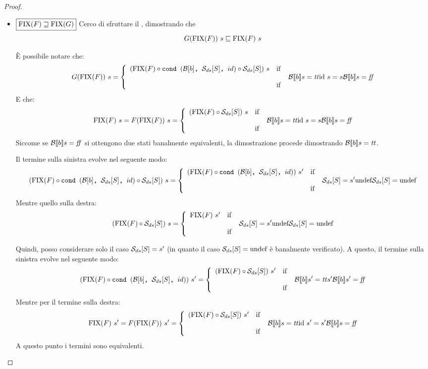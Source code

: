 {\begin{proof}
\begin{itemize}
  \item $\boxed{\textrm{\normalfont{FIX}}(F) \sqsupseteq \textrm{\normalfont{FIX}}(G)}$
  Cerco di sfruttare il \FPIL, dimostrando che
  $$
  G(\fixp{F})\ s \sqsubseteq \fixp{F}\ s
  $$

  È possibile notare che:
  $$
  G(\fixp{F})\ s =
    \caseFun{(\fixp{F} \circ
                 \cond{b}{\dsCtxt{S}}{id} \circ \dsCtxt{S})\ s}
            {\B{b} = \semtrue}
            {\idDS\ s = s}
            {\B{b} = \semfalse}
  $$
  E che:
  $$
  \fixp{F}\ s = F(\fixp{F})\ s =
    \caseFun{(\fixp{F} \circ \dsCtxt{S})\ s}
            {\B{b} = \semtrue}
            {\idDS\ s = s}
            {\B{b} = \semfalse}
  $$
  Siccome se $\mathcal{B} \llbracket b \rrbracket s = \mbox{\textit{ff}}$ si ottengono due stati banalmente equivalenti,
  la dimostrazione procede dimostrando $\mathcal{B} \llbracket b \rrbracket s = \mbox{\textit{tt}}$.

  Il termine sulla sinistra evolve nel seguente modo:
  $$
  (\fixp{F} \circ \cond{b}{\dsCtxt{S}}{id} \circ \dsCtxt{S})\ s =
    \caseFun{(\fixp{F} \circ
                 \cond{b}{\dsCtxt{S}}{id})\ s'}
            {\dsCtxt{S} = s'}
            {\undefDS}
            {\dsCtxt{S} = \undefDS}
  $$
  Mentre quello sulla destra:
  $$
  (\fixp{F} \circ \dsCtxt{S})\ s =
    \caseFun{\fixp{F}\ s'}
            {\dsCtxt{S} = s'}
            {\undefDS}
            {\dsCtxt{S} = \undefDS}
  $$

  Quindi, posso considerare solo il caso $\mathcal{S}_{ds}[S] = s'$ (in quanto il caso
  $\mathcal{S}_{ds}[S] = \textrm{\normalfont{undef}}$ è banalmente verificato). A questo, il termine sulla
  sinistra evolve nel seguente modo:
  $$
  (\fixp{F} \circ \cond{b}{\dsCtxt{S}}{id})\ s' =
    \caseFun{(\fixp{F} \circ \dsCtxt{S})\ s'}
            {\B{b}' = \semtrue}
            {s'}
            {\B{b}' = \semfalse}
  $$
  Mentre per il termine sulla destra:
  $$
  \fixp{F}\ s' = F(\fixp{F})\ s' =
    \caseFun{(\fixp{F} \circ \dsCtxt{S})\ s'}
            {\B{b} = \semtrue}
            {\idDS\ s' = s'}
            {\B{b} = \semfalse}
  $$
  A questo punto i termini sono equivalenti.
\end{itemize}

\end{proof}

}
